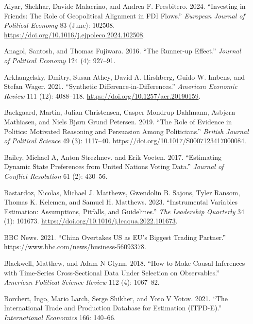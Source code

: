 \documentclass[
  12pt,
]{article}
\newlength{\cslhangindent}
\newenvironment{CSLReferences}[2] %
 {\begin{list}{}{%
  \setlength{\itemindent}{0pt}
  \setlength{\leftmargin}{0pt}
  \setlength{\parsep}{0pt}
  \ifodd #1
   \setlength{\leftmargin}{\cslhangindent}
   \setlength{\itemindent}{-1\cslhangindent}
  \fi
  \setlength{\itemsep}{#2\baselineskip}}}
 {\end{list}}
\begin{document}
\protect{}\label{refs}
\begin{CSLReferences}{1}{0}
Aiyar, Shekhar, Davide Malacrino, and Andrea F. Presbitero. 2024.
{``Investing in Friends: {The} Role of Geopolitical Alignment in {FDI}
Flows.''} \emph{European Journal of Political Economy} 83 (June):
102508. \url{https://doi.org/10.1016/j.ejpoleco.2024.102508}.

Anagol, Santosh, and Thomas Fujiwara. 2016. {``The Runner-up Effect.''}
\emph{Journal of Political Economy} 124 (4): 927--91.

Arkhangelsky, Dmitry, Susan Athey, David A. Hirshberg, Guido W. Imbens,
and Stefan Wager. 2021. {``Synthetic {Difference-in-Differences}.''}
\emph{American Economic Review} 111 (12): 4088--118.
\url{https://doi.org/10.1257/aer.20190159}.

Baekgaard, Martin, Julian Christensen, Casper Mondrup Dahlmann, Asbjørn
Mathiasen, and Niels Bjørn Grund Petersen. 2019. {``The {Role} of
{Evidence} in {Politics}: {Motivated Reasoning} and {Persuasion} Among
{Politicians}.''} \emph{British Journal of Political Science} 49 (3):
1117--40. \url{https://doi.org/10.1017/S0007123417000084}.

Bailey, Michael A, Anton Strezhnev, and Erik Voeten. 2017. {``Estimating
Dynamic State Preferences from {United Nations} Voting Data.''}
\emph{Journal of Conflict Resolution} 61 (2): 430--56.

Bastardoz, Nicolas, Michael J. Matthews, Gwendolin B. Sajons, Tyler
Ransom, Thomas K. Kelemen, and Samuel H. Matthews. 2023. {``Instrumental
Variables Estimation: {Assumptions}, Pitfalls, and Guidelines.''}
\emph{The Leadership Quarterly} 34 (1): 101673.
\url{https://doi.org/10.1016/j.leaqua.2022.101673}.

BBC News. 2021. {``China Overtakes {US} as {EU}'s Biggest Trading
Partner.''} https://www.bbc.com/news/business-56093378.

Blackwell, Matthew, and Adam N Glynn. 2018. {``How to Make Causal
Inferences with Time-Series Cross-Sectional Data Under Selection on
Observables.''} \emph{American Political Science Review} 112 (4):
1067--82.

Borchert, Ingo, Mario Larch, Serge Shikher, and Yoto V Yotov. 2021.
{``The International Trade and Production Database for Estimation
({ITPD-E}).''} \emph{International Economics} 166: 140--66.


\end{CSLReferences}
\end{document}
